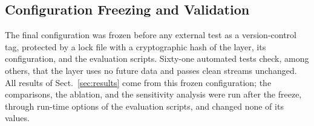 \subsection{Configuration Freezing and Validation}\label{sec:freeze}
The final configuration was frozen before any external test as a version-control tag, protected
by a lock file with a cryptographic hash of the layer, its configuration, and the evaluation
scripts. Sixty-one automated tests check, among others, that the layer uses no future data and
passes clean streams unchanged. All results of Sect.~\ref{sec:results} come from this frozen
configuration; the comparisons, the ablation, and the sensitivity analysis were run after the
freeze, through run-time options of the evaluation scripts, and changed none of its values.
